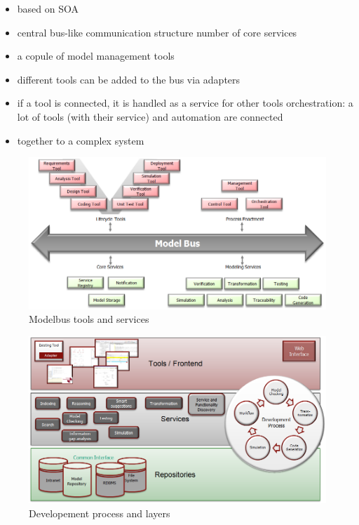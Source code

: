 \begin{itemize}
\item based on SOA
\item central bus-like communication structure
number of core services
\item a copule of model management tools
\item different tools can be added to the bus via adapters
\item if a tool is connected, it is handled as a service for other tools
orchestration: a lot of tools (with their service) and automation are connected \item together to a complex system
\end{itemize}

\begin{figure}
	\centering
		\includegraphics[width=\textwidth]{modelbus_1}
	\caption{Modelbus tools and services}
	\label{fig:sonarrunning}
\end{figure}

\begin{figure}
	\centering
		\includegraphics[width=\textwidth]{modelbus_2}
	\caption{Developement process and layers}
	\label{fig:sonarrunning}
\end{figure}

